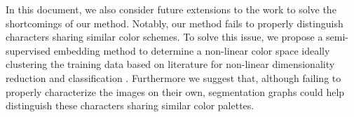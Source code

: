 In this document, we also consider future extensions to the work to solve the shortcomings of our method. Notably, our method fails to properly distinguish characters sharing similar color schemes. To solve this issue, we propose a semi-supervised embedding method to determine a non-linear color space ideally clustering the training data based on literature for non-linear dimensionality reduction \cite{roweis2000nonlinear} \cite{belkin2003laplacian} and classification \cite{urahama2007semi}. Furthermore we suggest that, although failing to properly characterize the images on their own, segmentation graphs could help distinguish these characters sharing similar color palettes.